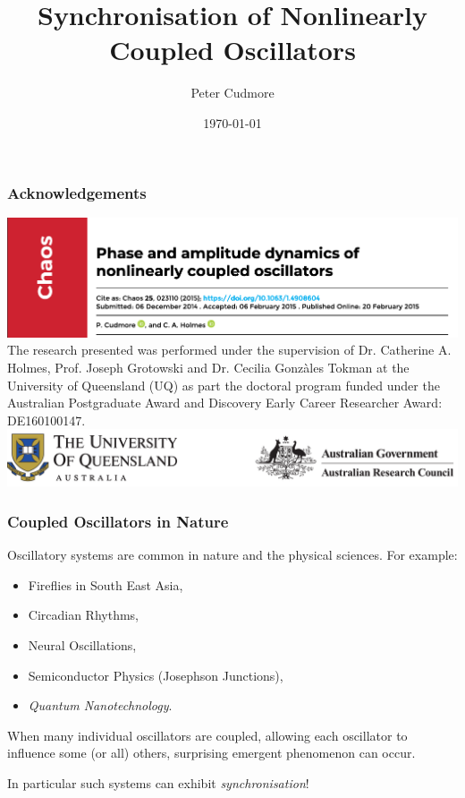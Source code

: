 \documentclass[10pt,reqno]{beamer}
\title{Synchronisation of Nonlinearly Coupled Oscillators}
\author{Peter Cudmore}
\institute{University of Melbourne}
\date{\today}
\begin{document}
\begin{frame}
\titlepage
\addtocounter{framenumber}{-1} 

\end{frame}

\begin{frame}
\frametitle{Acknowledgements}
\includegraphics[width=0.8\linewidth]{chaosss}
\vfill
{\scriptsize The research presented was performed under the supervision of Dr. Catherine A. Holmes, Prof. Joseph Grotowski and Dr. Cecilia Gonz\`ales Tokman at the University of Queensland (UQ) as part the doctoral program funded under the Australian Postgraduate Award and Discovery Early Career Researcher Award: DE160100147.}\\
\vfill
\includegraphics[width=\linewidth]{uqarc}	
\end{frame}
\begin{frame}
\frametitle{Coupled Oscillators in Nature}
Oscillatory systems are common in nature and the physical sciences. For example:
\begin{itemize}
	\item Fireflies in South East Asia,
	\item Circadian Rhythms,
	\item Neural Oscillations,
	\item Semiconductor Physics (Josephson Junctions), 
	\item {\em Quantum Nanotechnology}.
\end{itemize}
When many individual oscillators are coupled, allowing each oscillator to influence some (or all) others, surprising emergent phenomenon can occur.

In particular such systems can exhibit {\em synchronisation}!
\end{frame}
\end{document}
